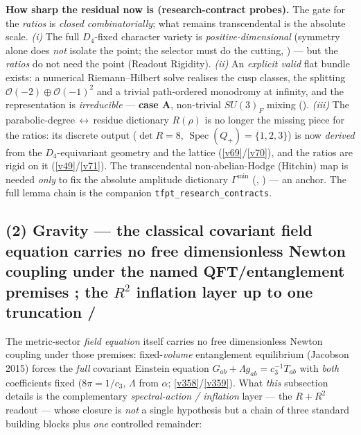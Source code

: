 \documentclass[11pt,a4paper]{article}
\newcommand{\cthree}{c_3}
\theoremstyle{definition}
\begin{document}
\smallskip
\noindent\textbf{How sharp the residual now is (research-contract probes).} The gate for the \emph{ratios} is
\emph{closed combinatorially}; what remains transcendental is the absolute scale. \emph{(i)} The full
$D_4$-fixed character variety is \emph{positive-dimensional} (symmetry alone does \emph{not} isolate the
point; the selector must do the cutting, ) --- but the \emph{ratios} do
not need the point (Readout Rigidity). \emph{(ii)} An \emph{explicit valid} flat bundle exists: a numerical
Riemann--Hilbert solve realises the cusp classes, the splitting $\mathcal O(-2)\oplus\mathcal O(-1)^2$ and a
trivial path-ordered monodromy at infinity, and the representation is \emph{irreducible} ---
\textbf{case A}, non-trivial $SU(3)_F$ mixing (). \emph{(iii)} The
parabolic-degree\,$\leftrightarrow$\,residue dictionary $R(\rho)$ is no longer the missing piece for the
ratios: its discrete output ($\det R=8$, $\operatorname{Spec}(Q_+)=\{1,2,3\}$) is now \emph{derived} from the
$D_4$-equivariant geometry and the lattice (\vref{v69}/\vref{v70}), and the ratios are rigid on it (\vref{v49}/\vref{v71}). The
transcendental non-abelian-Hodge (Hitchin) map is needed \emph{only} to fix the absolute amplitude dictionary
$\Gamma^{\min}$ (, ) --- an anchor. The full
lemma chain is the companion \texttt{tfpt\_research\_contracts}.

\subsection*{(2) Gravity --- the classical covariant field equation carries no free dimensionless Newton coupling under the named QFT/entanglement premises \mC; the $R^2$ inflation layer up to one truncation \mE/\mC}
The metric-sector \emph{field equation} itself carries no free dimensionless Newton coupling under those premises: fixed-\emph{volume} entanglement
equilibrium (Jacobson 2015) forces the \emph{full} covariant Einstein equation
$G_{ab}{+}\Lambda g_{ab}=\cthree^{-1}T_{ab}$ with \emph{both} coefficients fixed
($8\pi{=}1/\cthree$, $\Lambda$ from $\alpha$; \vref{v358}/\vref{v359}). What \emph{this} subsection details is
the complementary \emph{spectral-action / inflation} layer --- the $R+R^2$ readout --- whose closure is
\emph{not} a single hypothesis but a chain of three standard building blocks plus \emph{one} controlled
remainder:
\end{document}
